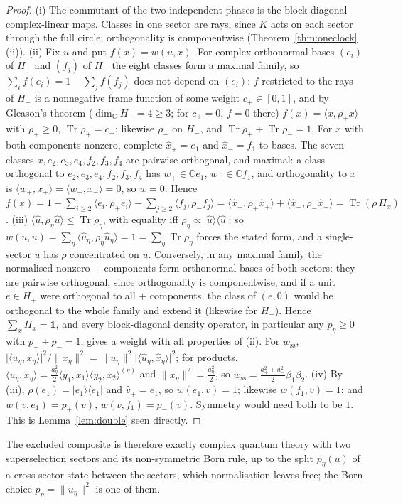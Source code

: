 \documentclass[aps,pra,onecolumn,superscriptaddress,nofootinbib,10pt]{revtex4-2}
\theoremstyle{definition}
\theoremstyle{remark}
\newcommand{\C}{\mathbb{C}}
\newcommand{\tr}{\operatorname{Tr}}
\newcommand{\ip}[2]{\langle #1,#2\rangle}
\begin{document}
\begin{proof}
(i) The commutant of the two independent phases is the block-diagonal complex-linear maps.  Classes in
one sector are rays, since $K$ acts on each sector through the full circle; orthogonality is
componentwise (Theorem~\ref{thm:oneclock}(ii)).
(ii) Fix $u$ and put $f(x)=w(u,x)$.  For complex-orthonormal bases $(e_i)$ of $H_+$ and $(f_j)$ of $H_-$ the eight
classes form a maximal family, so $\sum_if(e_i)=1-\sum_jf(f_j)$ does not depend on $(e_i)$: $f$ restricted to the
rays of $H_+$ is a nonnegative frame function of some weight $c_+\in[0,1]$, and by Gleason's theorem
\cite{Gleason57} ($\dim_\C H_+=4\ge3$; for $c_+=0$, $f=0$ there) $f(x)=\ip{x}{\rho_+x}$ with $\rho_+\ge0$, $\tr\rho_+=c_+$; likewise
$\rho_-$ on $H_-$, and $\tr\rho_++\tr\rho_-=1$.  For $x$ with both components nonzero, complete $\hat x_+=e_1$ and
$\hat x_-=f_1$ to bases.  The seven classes $x,e_2,e_3,e_4,f_2,f_3,f_4$ are pairwise orthogonal, and maximal: a class
orthogonal to $e_2,e_3,e_4,f_2,f_3,f_4$ has $w_+\in\C e_1$, $w_-\in\C f_1$, and orthogonality to $x$ is
$\ip{w_+}{x_+}=\ip{w_-}{x_-}=0$, so $w=0$.  Hence $f(x)=1-\sum_{i\ge2}\ip{e_i}{\rho_+e_i}-\sum_{j\ge2}\ip{f_j}{\rho_-f_j}=
\ip{\hat x_+}{\rho_+\hat x_+}+\ip{\hat x_-}{\rho_-\hat x_-}=\tr(\rho\,\Pi_x)$.
(iii) $\ip{\hat u}{\rho_\eta\hat u}\le\tr\rho_\eta$, with equality iff $\rho_\eta\propto\lvert\hat u\rangle\langle\hat u\rvert$; so $w(u,u)=\sum_\eta\ip{\hat u_\eta}{\rho_\eta\hat u_\eta}=1=\sum_\eta\tr\rho_\eta$
forces the stated form, and a single-sector $u$ has $\rho$ concentrated on $u$.  Conversely, in any maximal family
the normalised nonzero $\pm$ components form orthonormal bases of both sectors: they are pairwise orthogonal,
since orthogonality is componentwise, and if a unit $e\in H_+$ were orthogonal to all $+$ components, the class
of $(e,0)$ would be orthogonal to the whole family and extend it (likewise for $H_-$).  Hence $\sum_x\Pi_x=\mathbf1$, and
every block-diagonal density operator, in particular any $p_\eta\ge0$ with $p_++p_-=1$, gives a weight with all
properties of (ii).  For $w_{\mathrm{ss}}$, $\lvert\ip{u_\eta}{x_\eta}\rvert^2/\lVert x_\eta\rVert^2=\lVert u_\eta\rVert^2\lvert\ip{\hat u_\eta}{\hat x_\eta}\rvert^2$; for
products, $\ip{u_\eta}{x_\eta}=\tfrac{a_\eta^2}2\ip{y_1}{x_1}\ip{y_2}{x_2}^{(\eta)}$ and $\lVert x_\eta\rVert^2=\tfrac{a_\eta^2}2$, so
$w_{\mathrm{ss}}=\tfrac{a_+^2+a_-^2}2\beta_1\beta_2$.
(iv) By (iii), $\rho(e_1)=\lvert e_1\rangle\langle e_1\rvert$ and $\hat v_+=e_1$, so $w(e_1,v)=1$; likewise $w(f_1,v)=1$; and $w(v,e_1)=p_+(v)$,
$w(v,f_1)=p_-(v)$.  Symmetry would need both to be $1$.  This is Lemma~\ref{lem:double} seen directly.
\end{proof}
The excluded composite is therefore exactly complex quantum theory with two superselection sectors and
its non-symmetric Born rule, up to the split $p_\eta(u)$ of a cross-sector state between the sectors,
which normalisation leaves free; the Born choice $p_\eta=\lVert u_\eta\rVert^2$ is one of them.
\end{document}
